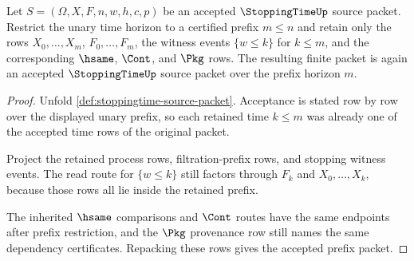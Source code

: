\begin{theorem}
\label{thm:stoppingtime-filtration-prefix-stability}
Let $S=(\Omega,X,F,n,w,h,c,p)$ be an accepted $\StoppingTimeUp$ source packet.
Restrict the unary time horizon to a certified prefix $m\leq n$ and retain
only the rows $X_0,\ldots,X_m$, $F_0,\ldots,F_m$, the witness events
$\{w\leq k\}$ for $k\leq m$, and the corresponding $\hsame$, $\Cont$, and
$\Pkg$ rows. The resulting finite packet is again an accepted
$\StoppingTimeUp$ source packet over the prefix horizon $m$.
\end{theorem}
\begin{proof}
Unfold \autoref{def:stoppingtime-source-packet}. Acceptance is stated row by
row over the displayed unary prefix, so each retained time $k\leq m$ was
already one of the accepted time rows of the original packet.

Project the retained process rows, filtration-prefix rows, and stopping
witness events. The read route for $\{w\leq k\}$ still factors through
$F_k$ and $X_0,\ldots,X_k$, because those rows all lie inside the retained
prefix.

The inherited $\hsame$ comparisons and $\Cont$ routes have the same endpoints
after prefix restriction, and the $\Pkg$ provenance row still names the same
dependency certificates. Repacking these rows gives the accepted prefix
packet.
\end{proof}

